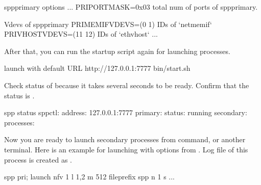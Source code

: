 \documentclass[a4paper,11pt,openany,oneside,english]{sphinxmanual}
\begin{document}
\begin{sphinxVerbatim}[commandchars=\\\{\},formatcom=\footnotesize]
\PYGZsh{} spp\PYGZus{}primary options
...
PRI\PYGZus{}PORTMASK=0x03  \PYGZsh{} total num of ports of spp\PYGZus{}primary.

\PYGZsh{} Vdevs of spp\PYGZus{}primary
\PYGZsh{}PRI\PYGZus{}MEMIF\PYGZus{}VDEVS=(0 1)  \PYGZsh{} IDs of {}`net\PYGZus{}memif{}`
\PYGZsh{}PRI\PYGZus{}VHOST\PYGZus{}VDEVS=(11 12)  \PYGZsh{} IDs of {}`eth\PYGZus{}vhost{}`
...
\end{sphinxVerbatim}

After that, you can run the startup script again for launching processes.

\begin{sphinxVerbatim}[commandchars=\\\{\},formatcom=\footnotesize]
 launch with default URL http://127.0.0.1:7777
 bin/start.sh

\end{sphinxVerbatim}

Check status of  because it takes several seconds to be ready.
Confirm that the status is .

\begin{sphinxVerbatim}[commandchars=\\\{\},formatcom=\footnotesize]
spp \PYGZgt{} status
\PYGZhy{} spp\PYGZhy{}ctl:
  \PYGZhy{} address: 127.0.0.1:7777
\PYGZhy{} primary:
  \PYGZhy{} status: running
\PYGZhy{} secondary:
  \PYGZhy{} processes:
\end{sphinxVerbatim}

Now you are ready to launch secondary processes from 
command, or another terminal. Here is an example for launching 
with options from .
Log file of this process is created as .

\begin{sphinxVerbatim}[commandchars=\\\{\},formatcom=\footnotesize]
spp \PYGZgt{} pri; launch nfv 1 \PYGZhy{}l 1,2 \PYGZhy{}m 512 \PYGZhy{}\PYGZhy{}file\PYGZhy{}prefix spp \PYGZhy{}\PYGZhy{} \PYGZhy{}n 1 \PYGZhy{}s ...
\end{sphinxVerbatim}
\end{document}
